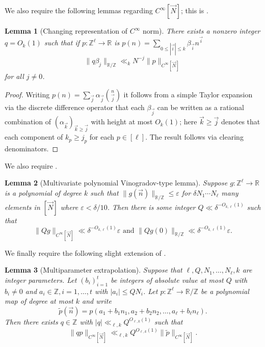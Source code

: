 \documentclass[11pt, a4paper]{amsart}
\theoremstyle{plain}
\theoremstyle{plain}
\newtheorem{lemma}{Lemma}
\theoremstyle{definition}
\theoremstyle{remark}
\numberwithin{equation}{section}
\numberwithin{lemma}{section}
\numberwithin{proposition}{section}
\numberwithin{corollary}{section}
\numberwithin{definition}{section}
\numberwithin{claim}{section}
\begin{document}
We also require the following lemmas regarding $C^\infty[\vec{N}]$; this is \cite[Lemma 2.1]{GT12}.
\begin{lemma}[Changing representation of $C^\infty$ norm]\label{l:cinfinity}
There exists a nonzero integer $q = O_k(1)$ such that if $p\colon \mathbb{Z}^\ell \to \mathbb{R}$ is $p(n) = \sum_{0 \le |\vec{i}| \le k} \beta_{\vec{i}} n^{\vec{i}}$
$$\|q\beta_j\|_{\mathbb{R}/\mathbb{Z}} \ll_k N^{-j}\|p\|_{C^\infty[\vec{N}]}$$
for all $j \neq 0$.
\end{lemma}
\begin{proof}
Writing $p(n) = \sum_{\vec{j}} \alpha_{\vec{j}} \binom{n}{\vec{j}}$ it follows from a simple Taylor expansion via the discrete difference operator that each $\beta_{\vec{j}}$ can be written as a rational combination of $(\alpha_{\vec{k}})_{\vec{k} \ge \vec{j}}$ with height at most $O_k(1)$; here $\vec{k} \ge \vec{j}$ denotes that each component of $k_p \ge j_p$ for each $p \in [\ell]$. The result follows via clearing denominators.
\end{proof}
We also require \cite[Lemma 2.3]{GT14}.
\begin{lemma}[Multivariate polynomial Vinogradov-type lemma]\label{l:vinogradov}
Suppose $g\colon \mathbb{Z}^\ell \to \mathbb{R}$ is a polynomial of degree $k$ such that $\|g(\vec{n})\|_{\mathbb{R}/\mathbb{Z}} \le \varepsilon$ for $\delta N_1 \cdots N_\ell$ many elements in $[\vec{N}]$ where $\varepsilon < \delta/10$. Then there is some integer $Q \ll \delta^{-O_{k, \ell}(1)}$ such that $$\|Qg\|_{C^\infty[\vec{N}]} \ll \delta^{-O_{k, \ell}(1)}\varepsilon \text{ and } \|Qg(0)\|_{\mathbb{R}/\mathbb{Z}} \ll \delta^{-O_{k, \ell}(1)}\varepsilon.$$
\end{lemma}
We finally require the following slight extension of \cite[Claim 5.8]{PSS23}.
\begin{lemma}[Multiparameter extrapolation]\label{l:multiparameterextrapolation}
    Suppose that $\ell, Q, N_1, \dots, N_\ell, k$ are integer parameters. Let $(b_i)_{i = 1}^t$ be integers of absolute value at most $Q$ with $b_i \neq 0$ and $a_i \in \mathbb{Z}, i = 1, \dots, t$ with $|a_i| \le QN_i$. Let $p\colon \mathbb{Z}^\ell \to \mathbb{R}/\mathbb{Z}$ be a polynomial map of degree at most $k$ and write
    $$\tilde{p}(\vec{n}) = p(a_1 + b_1n_1, a_2 + b_2n_2, \dots, a_\ell + b_\ell n_\ell).$$
    Then there exists $q \in \mathbb{Z}$ with $|q| \ll_{\ell, k} Q^{O_{\ell, k}(1)}$ such that
    $$\|qp\|_{C^\infty[\vec{N}]} \ll_{\ell, k} Q^{O_{\ell, k}(1)}\|\tilde{p}\|_{C^\infty[\vec{N}]}.$$
\end{lemma}
\end{document}

